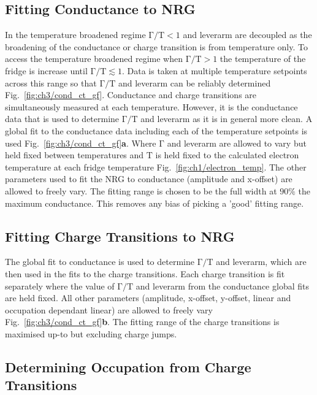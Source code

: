 \subsection{Fitting Conductance to NRG}
In the temperature broadened regime $\mathrm{\Gamma/T} < 1$ and leverarm are decoupled as the broadening of the conductance or charge transition is from temperature only. To access the temperature broadened regime when $\mathrm{\Gamma/T} > 1$ the temperature of the fridge is increase until $\mathrm{\Gamma/T} \lesssim 1$. Data is taken at multiple temperature setpoints across this range so that  $\mathrm{\Gamma/T}$ and leverarm can be reliably determined Fig.~\ref{fig:ch3/cond_ct_gf}. Conductance and charge transitions are simultaneously measured at each temperature. However, it is the conductance data that is used to determine $\mathrm{\Gamma/T}$ and leverarm as it is in general more clean. A global fit to the conductance data including each of the temperature setpoints is used Fig.~\ref{fig:ch3/cond_ct_gf}\textbf{a}. Where $\mathrm{\Gamma}$ and leverarm are allowed to vary but held fixed between temperatures and $\mathrm{T}$ is held fixed to the calculated electron temperature at each fridge temperature Fig.~\ref{fig:ch1/electron_temp}. The other parameters used to fit the NRG to conductance (amplitude and x-offset) are allowed to freely vary.
The fitting range is chosen to be the full width at $90\%$ the maximum conductance. This removes any bias of picking a 'good' fitting range. 

\subsection{Fitting Charge Transitions to NRG}
The global fit to conductance is used to determine $\mathrm{\Gamma/T}$ and leverarm, which are then used in the fits to the charge transitions. Each charge transition is fit separately where the value of $\mathrm{\Gamma/T}$ and leverarm from the conductance global fits are held fixed. All other parameters (amplitude, x-offset, y-offset, linear and occupation dependant linear) are allowed to freely vary Fig.~\ref{fig:ch3/cond_ct_gf}\textbf{b}. The fitting range of the charge transitions is maximised up-to but excluding charge jumps.


\subsection{Determining Occupation from Charge Transitions}

